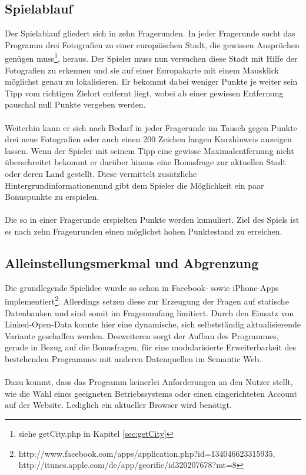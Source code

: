 \documentclass[a4paper, 11pt]{article}
\begin{document}
\subsection{Spielablauf}
Der Spielablauf gliedert sich in zehn Fragerunden. In jeder Fragerunde sucht das Programm drei Fotografien zu einer europäischen Stadt, die gewissen Ansprüchen genügen muss\footnote{siehe getCity.php in Kapitel \ref{sec:getCity}}, heraus. Der Spieler muss nun versuchen diese Stadt mit Hilfe der Fotografien zu erkennen und sie auf einer Europakarte mit einem Mausklick möglichst genau zu lokalisieren. Er bekommt dabei weniger Punkte je weiter sein Tipp vom richtigen Zielort entfernt liegt, wobei ab einer gewissen Entfernung pauschal null Punkte vergeben werden.\\\\ Weiterhin kann er sich nach Bedarf in jeder Fragerunde im Tausch gegen Punkte drei neue Fotografien oder auch einen 200 Zeichen langen Kurzhinweis anzeigen lassen. Wenn der Spieler mit seinem Tipp eine gewisse Maximalentfernung nicht überschreitet bekommt er darüber hinaus eine Bonusfrage zur aktuellen Stadt oder deren Land gestellt. Diese vermittelt zusätzliche Hintergrundinformationenund gibt dem Spieler die Möglichkeit ein paar Bonuspunkte zu erspielen.\\\\ 
Die so in einer Fragerunde erspielten Punkte werden kumuliert. Ziel des Spiels ist es nach zehn Fragenrunden einen möglichst hohen Punktestand zu erreichen.
\subsection{Alleinstellungsmerkmal und Abgrenzung}
Die grundlegende Spielidee wurde so schon in Facebook- sowie iPhone-Apps implementiert\footnote{http://www.facebook.com/apps/application.php?id=134046623315935, \\http://itunes.apple.com/de/app/georific/id320207678?mt=8}. Allerdings setzen diese zur Erzeugung der Fragen auf statische Datenbanken und sind somit im Fragenumfang limitiert. Durch den Einsatz von Linked-Open-Data konnte hier eine dynamische, sich selbstständig aktualisierende Variante geschaffen werden. Desweiteren sorgt der Aufbau des Programmes, gerade in Bezug auf die Bonusfragen, für eine modularisierte Erweiterbarkeit des bestehenden Programmes mit anderen Datenquellen im Semantic Web.\\\\
Dazu kommt, dass das Programm keinerlei Anforderungen an den Nutzer stellt, wie die Wahl eines geeigneten Betriebssystems oder einen eingerichteten Account auf der Website. Lediglich ein aktueller Browser wird benötigt.
\end{document}
